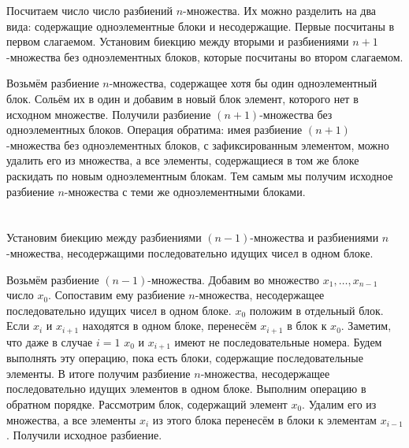 \documentclass{article}
\begin{document}
Посчитаем число число разбиений $n$-множества. Их можно разделить на два вида:
содержащие одноэлементные блоки и несодержащие.  Первые посчитаны в первом
слагаемом. Установим биекцию между вторыми и разбиениями $n+1$-множества без
одноэлементных блоков, которые посчитаны во втором слагаемом. 

Возьмём разбиение $n$-множества, содержащее хотя бы один одноэлементный блок.
Сольём их в один и добавим в новый блок элемент, которого нет в исходном
множестве. Получили разбиение $(n+1)$-множества без одноэлементных блоков.
Операция обратима: имея разбиение $(n+1)$-множества без одноэлементных блоков, с
зафиксированным элементом, можно удалить его из множества, а все элементы,
содержащиеся в том же блоке раскидать по новым одноэлементным блокам. Тем самым
мы получим исходное разбиение $n$-множества с теми же одноэлементными блоками.

\section{}

Установим биекцию между разбиениями $(n-1)$-множества и разбиениями
$n$-множества, несодержащими последовательно идущих чисел в одном блоке.

Возьмём разбиение $(n-1)$-множества. Добавим во множество ${x_1, \ldots,
x_{n-1}}$ число $x_0$. Сопоставим ему разбиение $n$-множества, несодержащее
последовательно идущих чисел в одном блоке. $x_0$ положим в отдельный блок.
Если $x_i$ и $x_{i+1}$ находятся в одном блоке, перенесём $x_{i+1}$ в блок к
$x_0$. Заметим, что даже в случае $i=1$ $x_0$ и $x_{i+1}$ имеют не
последовательные номера. Будем выполнять эту операцию, пока есть блоки,
содержащие последовательные элементы. В итоге получим разбиение $n$-множества,
несодержащее последовательно идущих элементов в одном блоке. Выполним операцию
в обратном порядке. Рассмотрим блок, содержащий элемент $x_0$. Удалим его из
множества, а все элементы $x_i$ из этого блока перенесём в блоки к элементам
$x_{i-1}$. Получили исходное разбиение.
\end{document}
